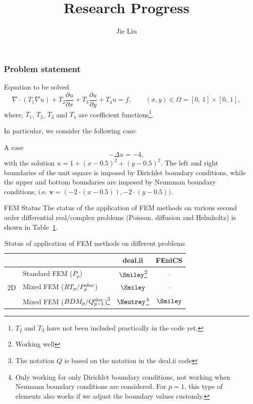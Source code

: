 \documentclass{beamer}
\title[]{Research Progress}
\institute[]{Delft University of Technology, the Netherlands}
\author{Jie Liu}
\begin{document}
{
\frame{\titlepage}
}


\begin{frame}
\frametitle{Problem statement}
\vspace{-1em}
\begin{block}{Equation to be solved}
\scriptsize
\begin{equation}
 \nabla \cdot (T_1 \nabla u) + T_2 \frac{\partial{u}}{\partial{x}} + T_3 \frac{\partial{u}}{\partial{y}} + T_4 u = f,\qquad (x,y) \in \Omega = [0,\,1] \times [0,\,1],
 \label{problem_to_be_investigated}
\end{equation}
where, $T_1$, $T_2$, $T_3$ and $T_4$ are coefficient functions\footnote{$T_2$ and $T_3$ have not been included practically in the code yet.}.
\end{block}

In particular, we consider the following case:
\begin{block}{A case}
\begin{equation}
 -\Delta u = -4,
\end{equation}
with the solution $u=1+(x-0.5)^2+(y-0.5)^2$.
The left and right boundaries of the unit square is imposed by Dirichlet boundary conditions, while the upper and bottom boundaries are imposed by Neumman boundary conditions, i.e. $\mathbf{v}=(-2\cdot(x-0.5)), -2\cdot(y-0.5))$.
\end{block}

\end{frame}


\begin{frame}{FEM Status}
\vspace{-2em}
The status of the application of FEM methods on various second order differential real/complex problems (Poisson, diffusion and Helmholtz) is shown in Table~\ref{table_status_fem_application}.

\begin{table}[!ht]
\scriptsize
\begin{tabular}{l | l | c | c}
\multicolumn{2}{c|}{} & deal.ii & FEniCS \\ \hline
\multirow{3}{*}{2D} & Standard FEM ($P_p$) & $\Smiley$\footnote{Working well} & -- \\ \cline{2-4}
 & Mixed FEM ($RT_p/P_{p}^{\rm disc}$) & $\Smiley$ & -- \\ \cline{2-4}
 & Mixed FEM ($BDM_p/Q_{p-1}^{\rm disc}$)\footnote{The notation $Q$ is based on the notation in the deal.ii code} & $\Neutrey$\footnote{Only working for only Dirichlet boundary conditions, not working when Neumann boundary conditions are considered. For $p=1$, this type of elements also works if we adjust the boundary values customly.} & $\Smiley$  
\end{tabular}
\caption{Status of application of FEM methods on different problems}
\label{table_status_fem_application}
\end{table}
\end{frame}
\end{document}
